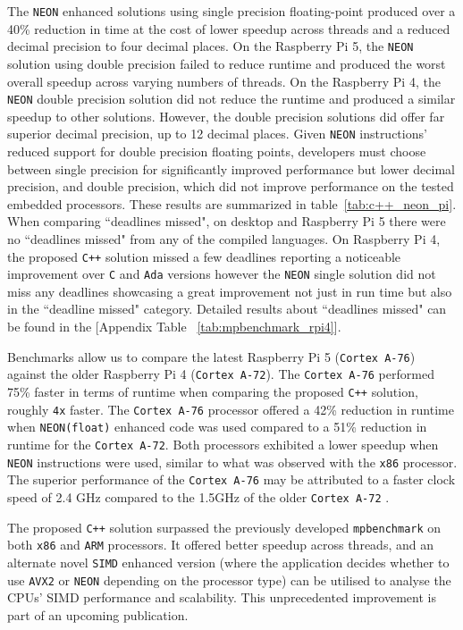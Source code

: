 The \texttt{NEON} enhanced solutions using single precision floating-point produced over a 40\% reduction in time at the cost of lower speedup across threads and a reduced decimal precision to four decimal places. On the Raspberry Pi 5, the \texttt{NEON} solution using double precision failed to reduce runtime and produced the worst overall speedup across varying numbers of threads. On the Raspberry Pi 4, the \texttt{NEON} double precision solution did not reduce the runtime and produced a similar speedup to other solutions. However, the double precision solutions did offer far superior decimal precision, up to 12 decimal places. Given \texttt{NEON} instructions' reduced support for double precision floating points, developers must choose between single precision for significantly improved performance but lower decimal precision, and double precision, which did not improve performance on the tested embedded processors. These results are summarized in table~\ref{tab:c++_neon_pi}. When comparing ``deadlines missed", on desktop and Raspberry Pi 5 there were no ``deadlines missed" from any of the compiled languages. On Raspberry Pi 4, the proposed \texttt{C++} solution missed a few deadlines reporting a noticeable improvement over \texttt{C} and \texttt{Ada} versions however the \texttt{NEON} single solution did not miss any deadlines showcasing a great improvement not just in run time but also in the ``deadline missed" category. Detailed results about ``deadlines missed" can be found in the [Appendix Table ~\ref{tab:mpbenchmark_rpi4}].

Benchmarks allow us to compare the latest Raspberry Pi 5 (\texttt{Cortex A-76}) against the older Raspberry Pi 4 (\texttt{Cortex A-72}). The \texttt{Cortex A-76} performed 75\% faster in terms of runtime when comparing the proposed \texttt{C++} solution, roughly \texttt{4x} faster. The \texttt{Cortex A-76} processor offered a 42\% reduction in runtime when \texttt{NEON(float)} enhanced code was used compared to a 51\% reduction in runtime for the \texttt{Cortex A-72}. Both processors exhibited a lower speedup when \texttt{NEON} instructions were used, similar to what was observed with the \texttt{x86} processor. The superior performance of the \texttt{Cortex A-76} may be attributed to a faster clock speed of 2.4 GHz compared to the 1.5GHz of the older \texttt{Cortex A-72} \cite{rasp_pi5_pi4_comparision}.

The proposed \texttt{C++} solution surpassed the previously developed \texttt{mpbenchmark}\cite{mpbenchmark_paper} on both \texttt{x86} and \texttt{ARM} processors. It offered better speedup across threads, and an alternate novel \texttt{SIMD} enhanced version (where the application decides whether to use \texttt{AVX2} or \texttt{NEON} depending on the processor type) can be utilised to analyse the CPUs' SIMD performance and scalability. This unprecedented improvement is part of an upcoming publication.

